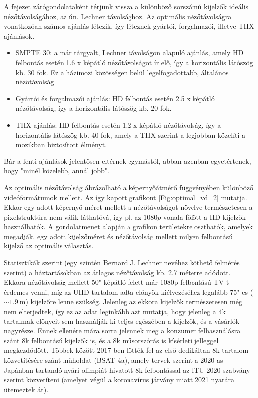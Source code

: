 A fejezet zárógondolataként térjünk vissza a különböző sorszámú kijelzők ideális nézőtávolságához, az ún. Lechner távolsághoz.
Az optimális nézőtávolságra vonatkozóan számos ajánlás létezik, így léteznek gyártói, forgalmazói, illetve THX ajánlások.
\begin{itemize}
\item SMPTE 30: a már tárgyalt, Lechner távolságon alapuló ajánlás, amely HD felbontás esetén 1.6 x képátló nézőtávolságot ír elő, így a horizontális látószög kb. 30 fok.
Ez a házimozi közösségen belül legelfogadottabb, általános nézőtávolság
\item Gyártói és forgalmazói ajánlás: HD felbontás esetén 2.5 x képátló nézőtávolság, így a horizontális látószög kb. 20 fok.
\item THX ajánlás: HD felbontás esetén 1.2 x képátló nézőtávolság, így a horizontális látószög kb. 40 fok, amely a THX szerint a legjobban közelíti a mozikban biztosított élményt.
\end{itemize}
Bár a fenti ajánlások jelentősen eltérnek egymástól, abban azonban egyetértenek, hogy "minél közelebb, annál jobb".

Az optimális nézőtávolság ábrázolható a képernyőátmérő függvényében különböző videóformátumok mellett.
Az így kapott grafikont \ref{Fig:optimal_vd_2} mutatja.
Ekkor egy adott képernyő méret mellett a nézőtávolságot növelve természetesen a pixelstruktúra nem válik láthatóvá, így pl. az $1080p$ vonala fölött a HD kijelzők használhatók.
A gondolatmenet alapján a grafikon területekre oszthatók, amelyek megadják, egy adott kijelzőméret és nézőtávolság mellett milyen felbontású kijelző az optimális választás.

Statisztikák szerint (egy szintén Bernard J. Lechner nevéhez köthető felmérés szerint) a háztartásokban az átlagos nézőtávolság kb. 2.7 méterre adódott.
Ekkora nézőtávolság mellett 50" képátló felett már 1080p felbontású TV-t érdemes venni, míg az UHD tartalom adta előnyök kiélvezéséhez legalább 75"-es ($\sim 1.9~\mathrm{m}$) kijelzőre lenne szükség.
Jelenleg az ekkora kijelzők természetesen még nem elterjedtek, így ez az adat leginkább azt mutatja, hogy jelenleg a 4k tartalmak előnyeit sem használják ki teljes egészében a kijelzők, és a vásárlók nagyrésze.
Ennek ellenére mára sorra jelennek meg a konzumer felhasználásra szánt 8k felbontású kijelzők is, és a 8k műsorszórás is kísérleti jelleggel megkezdődött.
Többek között 2017-ben lőtték fel az első dedikáltan 8k tartalom közvetítésére szánt műholdat (BSAT-4a), amely tervek szerint a 2020-as Japánban tartandó nyári olimpiát hivatott 8k felbontással az ITU-2020 szabvány szerint közvetíteni (amelyet végül a koronavírus járvány miatt 2021 nyarára ütemeztek át).



